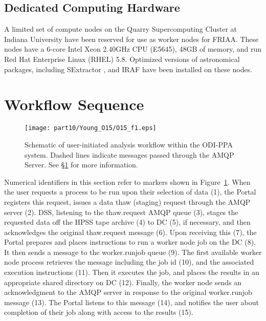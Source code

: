 \subsection{Dedicated Computing Hardware}
\label{section:wn}

A limited set of compute nodes on the Quarry Supercomputing Cluster at Indiana University have been reserved for use as worker nodes for FRIAA.  These nodes have a 6-core Intel Xeon 2.40GHz CPU (E5645), 48GB of memory, and run Red Hat Enterprise Linux (RHEL) 5.8.  Optimized versions of astronomical packages, including SExtractor \citep{sextractor}, and IRAF \citep{iraf} have been installed on these nodes. 

\section{Workflow Sequence}
\label{section:workflow}

\begin{figure}
\texttt{[image: part10/Young\_O15/O15\_f1.eps]}
\caption{Schematic of user-initiated analysis workflow within the ODI-PPA system.  Dashed lines indicate messages passed through the AMQP Server. See \S\ref{section:workflow} for more information.}
\label{fig:workflow}
\end{figure}

Numerical identifiers in this section refer to markers shown in Figure~\ref{fig:workflow}.  When the user requests a process to be run upon their selection of data (1), the Portal registers this request, issues a data thaw (staging) request through the AMQP server (2).  DSS, listening to the thaw.request AMQP queue (3), stages the requested data off the HPSS tape archive (4) to DC (5), if necessary, and then acknowledges the original thaw.request message (6).  Upon receiving this (7), the Portal prepares and places instructions to run a worker node job on the DC (8).  It then sends a message to the worker.runjob queue (9).   The first available worker node process retrieves the message including the job id (10), and the associated execution instructions (11). Then it executes the job, and places the results in an appropriate shared directory on DC (12).  Finally, the worker node sends an acknowledgment to the AMQP server in response to the original worker.runjob message (13). The Portal listens to this message (14), and notifies the user about completion of their job along with access to the results (15).  

